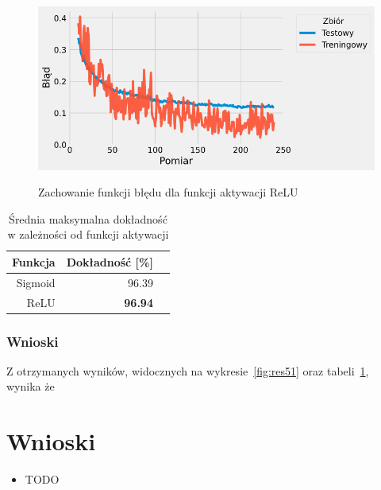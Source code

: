 \documentclass{article}
\begin{document}
\begin{figure}[H]
	\centering
	\caption{Zachowanie funkcji błędu dla funkcji aktywacji ReLU}
	\includegraphics[width=\textwidth]{activation_err_relu.png}
	\label{fig:res54}
\end{figure}

\begin{table}[H]
	\caption{Średnia maksymalna dokładność w zależności od funkcji aktywacji}
	\label{tabela-res-51}
	\centering
	\begin{tabular}{rrr}
		\toprule
		Funkcja & Dokładność [\%] \\
		\midrule
		Sigmoid & 96.39              \\
		ReLU    & \textbf{96.94}     \\
		\bottomrule
	\end{tabular}
\end{table}

\subsubsection*{Wnioski}

Z otrzymanych wyników, widocznych na wykresie~\ref{fig:res51} oraz tabeli~\ref{tabela-res-51}, wynika że


\newpage
\section{Wnioski}

\begin{itemize}
	\item TODO
\end{itemize}
\end{document}
